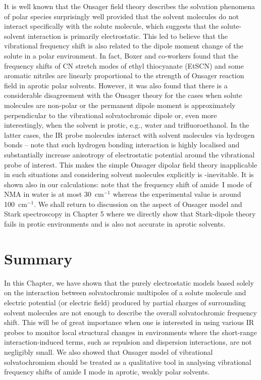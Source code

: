 \documentclass[a4paper,titlepage,twoside,fleqn,12pt]{book}
\begin{document}
\begin{refsection}
It is well known that the Onsager field theory describes
the solvation phenomena of polar species surprisingly
well provided that the solvent molecules do not interact
specifically with the solute molecule, which suggests that the
solute\hyp{}solvent interaction is primarily electrostatic. This led
to believe that the vibrational frequency shift is also related
to the dipole moment change of the solute in a polar
environment. In fact, Boxer and co\hyp{}workers found that the
frequency shifts of CN stretch modes of ethyl thiocyanate
(EtSCN) \citep{Fafarman.Sigala.Herschlag.Boxer.JACS.2010} 
and some aromatic nitriles \citep{Levinson.Fried.Boxer.JPCB.2012} 
are linearly proportional
to the strength of Onsager reaction field in aprotic polar
solvents. However, it was also found that there is a considerable
disagreement with the Onsager theory for the cases
when solute molecules are non-polar or the permanent dipole
moment is approximately perpendicular to the vibrational
solvatochromic dipole \citep{Levinson.Fried.Boxer.JPCB.2012} 
or, even more interestingly, when
the solvent is protic, e.g., water and 
trifluoroethanol. \citep{Fafarman.Sigala.Herschlag.Boxer.JACS.2010}  
In the latter cases, the IR probe molecules interact with solvent
molecules via hydrogen bonds -- note that such hydrogen bonding
interaction is highly localised and substantially
increase anisotropy of electrostatic potential around the vibrational
probe of interest. This makes the simple Onsager
dipolar field theory inapplicable in such situations and considering
solvent molecules explicitly is \hyp{inevitable}. It is shown also in our 
calculations: note that the frequency shift of amide~I mode of NMA in water
is at most 30~cm$^{-1}$ whereas the experimental value
is around 100~cm$^{-1}$. We shall return to discussion
on the aspect of Onsager model and Stark spectroscopy in Chapter 5 
where we directly show that Stark\hyp{}dipole
theory fails in protic environments and is also not accurate in aprotic solvents.

\section{Summary}

In this Chapter, we have shown that the purely electrostatic
models based solely on the interaction between
solvatochromic multipoles of a solute molecule and electric
potential (or electric field) produced by partial charges of
surrounding solvent molecules are not enough to describe the
overall solvatochromic frequency shift. This will be of great
importance when one is interested in using various IR probes
to monitor local structural changes in environments where the
short\hyp{}range interaction\hyp{}induced terms, such as repulsion and
dispersion interactions, are not negligibly small.
We also showed that Onsager model of vibrational solvatochromism
should be treated as a qualitative tool in analysing vibrational
frequency shifts of amide I mode in aprotic, weakly polar solvents.

\printbibliography[heading=subbibintoc,title={References}]
\end{refsection}
\end{document}
